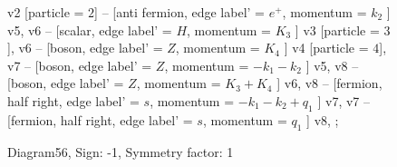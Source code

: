 \documentclass{revtex4}
\begin{document}
\begin{figure}[!htb]
\begin{center}
{v2 [particle = \(2\)] -- [anti fermion, edge label' = \(e^{+}\), momentum = \(k_{2}\) ] v5, 
v6 -- [scalar, edge label' = \(H\), momentum = \(K_{3}\) ] v3 [particle = \(3\)], 
v6 -- [boson, edge label' = \(Z\), momentum = \(K_{4}\) ] v4 [particle = \(4\)], 
v7 -- [boson, edge label' = \(Z\), momentum = \(-k_{1} - k_{2}\) ] v5, 
v8 -- [boson, edge label' = \(Z\), momentum = \(K_{3} + K_{4}\) ] v6, 
v8 -- [fermion, half right, edge label' = \(s\), momentum = \(-k_{1} - k_{2} + q_{1}\) ] v7, 
v7 -- [fermion, half right, edge label' = \(s\), momentum = \(q_{1}\) ] v8, 
};
\end{center}
\caption{Diagram56, Sign: -1, Symmetry factor: 1}
\end{figure}
\newpage
\end{document}

